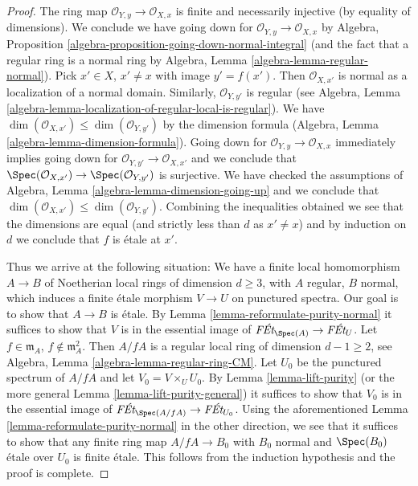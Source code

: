 \begin{proof}
\medskip\noindent
The ring map $\mathcal{O}_{Y, y} \to \mathcal{O}_{X, x}$ is
finite and necessarily injective (by equality of dimensions).
We conclude we have going down for
$\mathcal{O}_{Y, y} \to \mathcal{O}_{X, x}$
by Algebra, Proposition \ref{algebra-proposition-going-down-normal-integral}
(and the fact that a regular ring is a normal ring by
Algebra, Lemma \ref{algebra-lemma-regular-normal}).
Pick $x' \in X$, $x' \not = x$ with image $y' = f(x')$.
Then $\mathcal{O}_{X, x'}$ is normal as a localization
of a normal domain. Similarly, $\mathcal{O}_{Y, y'}$ is
regular (see Algebra, Lemma
\ref{algebra-lemma-localization-of-regular-local-is-regular}).
We have $\dim(\mathcal{O}_{X, x'}) \leq \dim(\mathcal{O}_{Y, y'})$
by the dimension formula
(Algebra, Lemma \ref{algebra-lemma-dimension-formula}).
Going down for $\mathcal{O}_{Y, y} \to \mathcal{O}_{X, x}$
immediately implies going down for
$\mathcal{O}_{Y, y'} \to \mathcal{O}_{X, x'}$ and we conclude that
$\Spec(\mathcal{O}_{X, x'}) \to \Spec(\mathcal{O}_{Y, y'})$
is surjective. We have checked the assumptions of
Algebra, Lemma \ref{algebra-lemma-dimension-going-up}
and we conclude that
$\dim(\mathcal{O}_{X, x'}) \leq \dim(\mathcal{O}_{Y, y'})$.
Combining the inequalities obtained we see that the dimensions are equal
(and strictly less than $d$ as $x' \not = x$)
and by induction on $d$ we conclude that $f$ is \'etale
at $x'$.

\medskip\noindent
Thus we arrive at the following situation: We have a finite
local homomorphism $A \to B$ of Noetherian local rings
of dimension $d \geq 3$, with $A$ regular, $B$ normal, which
induces a finite \'etale morphism $V \to U$ on punctured spectra.
Our goal is to show that $A \to B$ is \'etale.
By Lemma \ref{lemma-reformulate-purity-normal}
it suffices to show that $V$ is in the essential image
of $\textit{F\'Et}_{\Spec(A)} \to \textit{F\'Et}_U$.
Let $f \in \mathfrak m_A$, $f \not \in \mathfrak m_A^2$.
Then $A/fA$ is a regular local ring of dimension $d - 1 \geq 2$, see
Algebra, Lemma \ref{algebra-lemma-regular-ring-CM}.
Let $U_0$ be the punctured spectrum of $A/fA$ and let
$V_0 = V \times_U U_0$.
By Lemma \ref{lemma-lift-purity} (or the more general
Lemma \ref{lemma-lift-purity-general})
it suffices to show that $V_0$ is in the essential
image of $\textit{F\'Et}_{\Spec(A/fA)} \to \textit{F\'Et}_{U_0}$.
Using the aforementioned
Lemma \ref{lemma-reformulate-purity-normal}
in the other direction, we see that it suffices to show
that any finite ring map $A/fA \to B_0$ with $B_0$
normal and $\Spec(B_0)$ \'etale over $U_0$ is finite \'etale.
This follows from the induction hypothesis and the proof is complete.
\end{proof}






